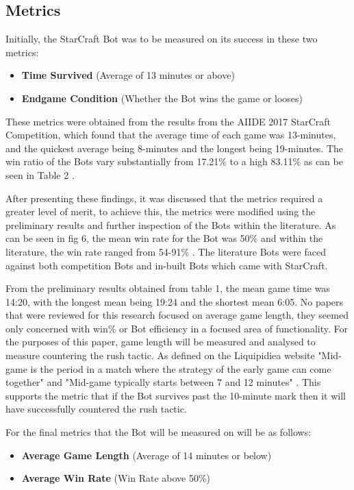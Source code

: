\documentclass[journal]{IEEEtran}
\begin{document}
	\subsection{Metrics}
	
	Initially, the StarCraft Bot was to be measured on its success in these two metrics:
	\begin{itemize}
		\item \textbf{Time Survived} (Average of 13 minutes or above)
		\item \textbf{Endgame Condition} (Whether the Bot wins the game or looses)
	\end{itemize}
	These metrics were obtained from the results from the AIIDE 2017 StarCraft Competition, which found that the average time of each game was 13-minutes, and the quickest average being 8-minutes and the longest being 19-minutes. The win ratio of the Bots vary substantially from 17.21\% to a high 83.11\% as can be seen in Table 2 \cite{Results}. 
	
	After presenting these findings, it was discussed that the metrics required a greater level of merit, to achieve this, the metrics were modified using the preliminary results and further inspection of the Bots within the literature. As can be seen in fig 6, the mean win rate for the Bot was 50\% and within the literature, the win rate ranged from 54-91\% \cite{ELGoal,Swen,OnlineEvo,GoalDriven}. The literature Bots were faced against both competition Bots and in-built Bots which came with StarCraft.
	
	From the preliminary results obtained from table 1, the mean game time was 14:20, with the longest mean being 19:24 and the shortest mean 6:05. No papers that were reviewed for this research focused on average game length, they seemed only concerned with win\% or Bot efficiency in a focused area of functionality. For the purposes of this paper, game length will be measured and analysed to measure countering the rush tactic. As defined on the Liquipidiea website "Mid-game is the period in a match where the strategy of the early game can come together" and "Mid-game typically starts between 7 and 12 minutes" \cite{Liqui}. This supports the metric that if the Bot survives past the 10-minute mark then it will have successfully countered the rush tactic. 
	\newline
	
	For the final metrics that the Bot will be measured on will be as follows:
	\begin{itemize}
		\item \textbf{Average Game Length} (Average of 14 minutes or below)
		\item \textbf{Average Win Rate} (Win Rate above 50\%)
	\end{itemize}
	
\end{document}
